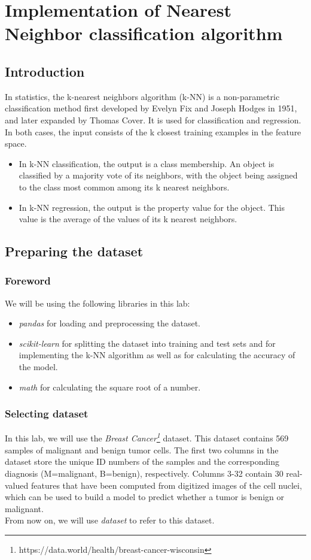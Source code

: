 \chapter{Implementation of Nearest Neighbor classification algorithm}
\section{Introduction}
In statistics, the k-nearest neighbors algorithm (k-NN) is a non-parametric classification method first developed by Evelyn Fix and Joseph Hodges in 1951, and later expanded by Thomas Cover. It is used for classification and regression. In both cases, the input consists of the k closest training examples in the feature space.
\begin{itemize}
    \item In k-NN classification, the output is a class membership. An object is classified by a majority vote of its neighbors, with the object being assigned to the class most common among its k nearest neighbors.
    \item In k-NN regression, the output is the property value for the object. This value is the average of the values of its k nearest neighbors.
\end{itemize}
\section{Preparing the dataset}
\subsection{Foreword}
We will be using the following libraries in this lab:
\begin{itemize}
    \item \textit{pandas} for loading and preprocessing the dataset.
    \item \textit{scikit-learn} for splitting the dataset into training and test sets and for implementing the k-NN algorithm as well as for calculating the accuracy of the model.
    \item \textit{math} for calculating the square root of a number.
\end{itemize}
\subsection{Selecting dataset}
In this lab, we will use the \textit{Breast Cancer\footnote{https://data.world/health/breast-cancer-wisconsin}} dataset. This dataset contains 569 samples of malignant and benign tumor cells. The first two columns in the dataset store the unique ID numbers of the samples and the corresponding diagnosis (M=malignant, B=benign), respectively. Columns 3-32 contain 30 real-valued features that have been computed from digitized images of the cell nuclei, which can be used to build a model to predict whether a tumor is benign or malignant.\\
From now on, we will use \textit{dataset} to refer to this dataset.

